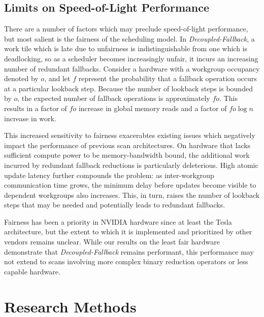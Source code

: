 \documentclass[sigconf]{acmart}
\begin{document}
\subsection{Limits on Speed-of-Light Performance}
 There are a number of factors which may preclude speed-of-light performance, but most salient is the fairness of the scheduling model. In \emph{Decoupled-Fallback}, a work tile which is late due to unfairness is indistinguishable from one which is deadlocking, so as a scheduler becomes increasingly unfair, it incurs an increasing number of redundant fallbacks. Consider a hardware with a workgroup occupancy denoted by $o$, and let $f$ represent the probability that a fallback operation occurs at a particular lookback step. Because the number of lookback steps is bounded by $o$, the expected number of fallback operations is approximately $fo$. This results in a factor of $fo$ increase in global memory reads and a factor of $fo\log{n}$ increase in work.
 
 This increased sensitivity to fairness exacerabtes existing issues which negatively impact the performance of previous scan architectures. On hardware that lacks sufficient compute power to be memory-bandwidth bound, the additional work incurred by redundant fallback reductions is particularly deleterious. High atomic update latency further compounds the problem: as inter-workgroup communication time grows, the minimum delay before updates become visible to dependent workgroups also increases. This, in turn, raises the number of lookback steps that may be needed and potentially leads to redundant fallbacks.

 Fairness has been a priority in NVIDIA hardware since at least the Tesla architecture\cite{}, but the extent to which it is implemented and prioritized by other vendors remains unclear. While our results on the least fair hardware demonstrate that \emph{Decoupled-Fallback} remains performant, this performance may not extend to scans involving more complex binary reduction operators or less capable hardware.
\begin{acks}
\end{acks}




\appendix

\section{Research Methods}
\end{document}
